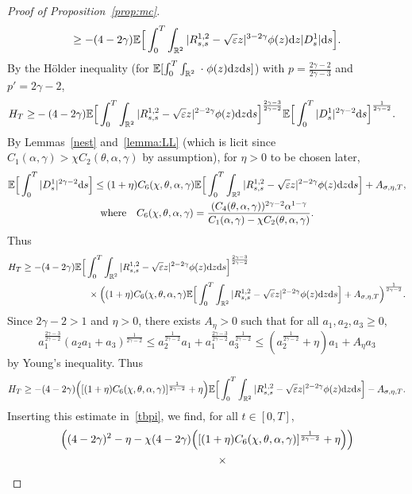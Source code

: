 \documentclass[11pt]{article}
\newcommand{\E}{\mathbb{E}}
\newcommand{\R}{\mathbb{R}}
\newcommand{\1}{\mathbbm{1}}
\newcommand{\dd}{{\rm d}}
\newcommand{\e}{\varepsilon}
\begin{document}
\begin{proof}[Proof of Proposition~\ref{prop:mc}]
$$\geq -(4-2\gamma) \E \Big[\int_0^T \int_{\R^2}  |R^{1,2}_{s,s}-\sqrt\e z|^{3-2\gamma} \phi(z)\dd z |D^1_s| \dd s \Big].
$$
By the H\"older inequality (for $\E[\int_0^T \int_{\R^2} \;\cdot\; \phi(z)\dd z \dd s]$) with  $p=\frac{2\gamma-2}{2\gamma-3}$ and $p'=2\gamma-2$,
\begin{align*}
H_T \geq& -(4-2\gamma) \E \Big[\int_0^T \int_{\R^2} |R^{1,2}_{s,s}-\sqrt\e z|^{2-2\gamma} \phi(z)\dd z\dd s \Big]^{\frac{2\gamma-3}{2\gamma-2}}
 \E \Big[\int_0^T  |D^{1}_{s}|^{2\gamma-2} \dd s \Big]^{\frac{1}{2\gamma-2}}.
\end{align*}
By Lemmas~\ref{nest} and~\ref{lemma:LL} (which is licit since 
$C_1(\alpha,\gamma)>\chi C_2(\theta,\alpha,\gamma)$ by assumption), for $\eta>0$ to be chosen later,
\begin{gather}
\E \Big[\int_0^T  |D^{1}_{s}|^{2\gamma-2} \dd s \Big]\leq  (1+\eta) C_6(\chi,\theta,\alpha,\gamma)\E\Big[
\int_0^T \int_{\R^2}  |R^{1,2}_{s,s}-\sqrt \e z|^{2-2\gamma} \phi(z)\dd z\dd s\Big]
+A_{\sigma,\eta,T},\notag\\
\text{where} \quad C_6(\chi,\theta,\alpha,\gamma)= \frac{(C_4(\theta,\alpha,\gamma))^{2\gamma-2}\alpha^{1-\gamma}}
{C_1(\alpha,\gamma)-\chi C_2(\theta,\alpha,\gamma)}. \label{C6}
\end{gather}
Thus
\begin{align*}
&H_T\geq -(4-2\gamma) \E \Big[\int_0^T \int_{\R^2} |R^{1,2}_{s,s}-\sqrt\e z|^{2-2\gamma} \phi(z)\dd z\dd s \Big]^{\frac{2\gamma-3}{2\gamma-2}}\\
&\hskip3cm\times\Big((1+\eta) C_6(\chi,\theta,\alpha,\gamma)\E\Big[
\int_0^T \int_{\R^2} |R^{1,2}_{s,s}-\sqrt\e z|^{2-2\gamma} \phi(z)\dd z\dd s\Big]
+A_{\sigma,\eta,T}\Big)^{\frac1{2\gamma-2}}.
\end{align*}
Since $2\gamma-2>1$ and $\eta>0$, there exists $A_{\eta}>0$ such that for all $a_1,a_2,a_3\geq 0$,
$$
a_1^{\frac{2\gamma-3}{2\gamma-2}}(a_2a_1+a_3)^{\frac1{2\gamma-2}}\leq a_2^{\frac1{2\gamma-2}}a_1
+a_1^{\frac{2\gamma-3}{2\gamma-2}}a_3^{\frac1{2\gamma-2}}\leq (a_2^{\frac1{2\gamma-2}}+\eta)a_1+A_{\eta}a_3
$$
by Young's inequality. Thus
$$
H_T\geq -(4-2\gamma) \Big([(1+\eta) C_6(\chi,\theta,\alpha,\gamma)]^{\frac 1{2\gamma-2}}+\eta\Big)
\E \Big[\int_0^T \int_{\R^2} |R^{1,2}_{s,s}-\sqrt\e z|^{2-2\gamma}\phi(z)\dd z \dd s \Big] - A_{\sigma,\eta,T}.
$$
Inserting this estimate in~\eqref{tbpi}, we find, for all $t\in [0,T]$,
\begin{align}
&\Big((4-2\gamma)^2 - \eta-\chi (4-2\gamma) 
\Big([(1+\eta) C_6(\chi,\theta,\alpha,\gamma)]^{\frac 1{2\gamma-2}}+\eta\Big) \Big) \notag\\ &\hskip5cm \times

\end{align}
\end{proof}
\end{document}
